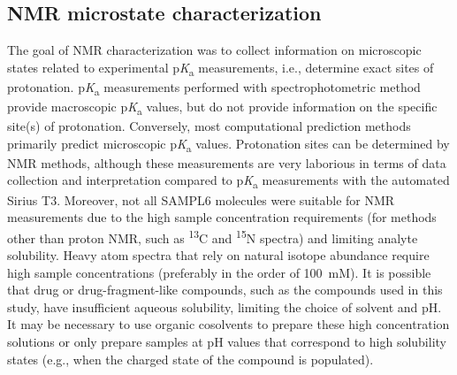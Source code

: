\documentclass[9pt,lineno]{elife}
\newcommand{\pKa}{p\textit{K}\textsubscript{a}}
\begin{document}
\subsection{NMR microstate characterization}

The goal of NMR characterization was to collect information on microscopic states related to experimental \pKa{} measurements, i.e., determine exact sites of protonation. 
\pKa{} measurements performed with spectrophotometric method provide macroscopic \pKa{} values, but do not provide information on the specific site(s) of protonation. 
Conversely, most computational prediction methods primarily predict microscopic \pKa{} values. 
Protonation sites can be determined by NMR methods, although these measurements are very laborious in terms of data collection and interpretation compared to \pKa{} measurements with the automated Sirius T3. 
Moreover, not all SAMPL6 molecules were suitable for NMR measurements due to the high sample concentration requirements (for methods other than proton NMR, such as \textsuperscript{13}C and \textsuperscript{15}N spectra) and limiting analyte solubility. 
Heavy atom spectra that rely on natural isotope abundance require high sample concentrations (preferably in the order of 100~mM). It is possible that drug or drug-fragment-like compounds, such as the compounds used in this study, have insufficient aqueous solubility, limiting the choice of solvent and pH. 
It may be necessary to use organic cosolvents to prepare these high concentration solutions or only prepare samples at pH values that correspond to high solubility states (e.g., when the charged state of the compound is populated). 
\end{document}
